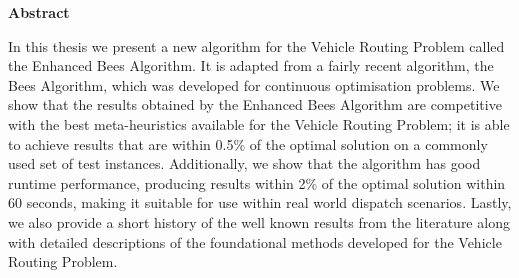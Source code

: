 \begin{center}
   \begin{minipage}{300pt}
   \begin{center}
      \textbf{Abstract}
   \end{center}
   In this thesis we present a new algorithm for the Vehicle Routing Problem called the Enhanced Bees Algorithm. It is adapted from a fairly recent algorithm, the Bees Algorithm, which was developed for continuous optimisation problems. We show that the results obtained by the Enhanced Bees Algorithm are competitive with the best meta-heuristics available for the Vehicle Routing Problem; it is able to achieve results that are within 0.5\% of the optimal solution on a commonly used set of test instances. Additionally, we show that the algorithm has good runtime performance, producing results within 2\% of the optimal solution within 60 seconds, making it suitable for use within real world dispatch scenarios. Lastly, we also provide a short history of the well known results from the literature along with detailed descriptions of the foundational methods developed for the Vehicle Routing Problem.
   \end{minipage}
\end{center}

\cleardoublepage
